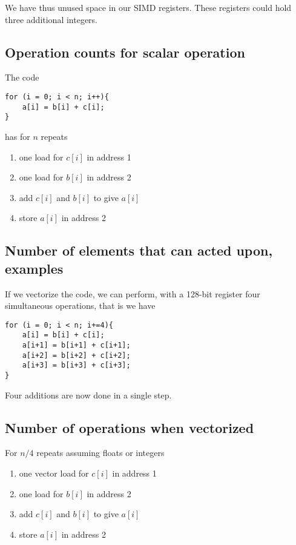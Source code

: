 \documentclass[%
oneside,                 %
final,                   %
10pt]{article}
\begin{document}
We have thus unused space in our SIMD registers. These registers could hold three additional integers.

\subsection*{Operation counts for scalar operation}
The code




\begin{verbatim}
for (i = 0; i < n; i++){
    a[i] = b[i] + c[i];
}

\end{verbatim}

has for $n$ repeats
\begin{enumerate}
\item one load for $c[i]$ in address 1

\item one load for $b[i]$ in address 2

\item add $c[i]$ and $b[i]$ to give $a[i]$

\item store $a[i]$ in address 2
\end{enumerate}

\noindent
\subsection*{Number of elements that can acted upon, examples}
If we vectorize the code, we can perform, with a 128-bit register four simultaneous operations, that is
we have







\begin{verbatim}
for (i = 0; i < n; i+=4){
    a[i] = b[i] + c[i];
    a[i+1] = b[i+1] + c[i+1];
    a[i+2] = b[i+2] + c[i+2];
    a[i+3] = b[i+3] + c[i+3];
}

\end{verbatim}


Four additions are now done in a single step.

\subsection*{Number of operations when vectorized}
For $n/4$ repeats assuming floats or integers
\begin{enumerate}
\item one vector load for $c[i]$ in address 1

\item one load for $b[i]$ in address 2

\item add $c[i]$ and $b[i]$ to give $a[i]$

\item store $a[i]$ in address 2
\end{enumerate}
\end{document}
